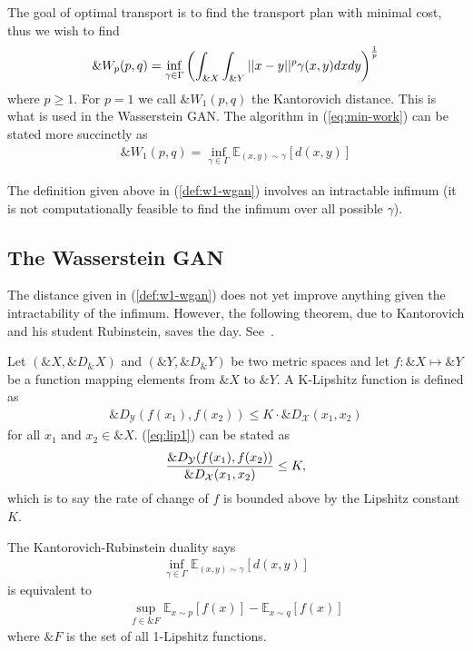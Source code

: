 The goal of optimal transport is to find the transport plan with minimal cost,
thus we wish to find
\begin{align}%
  \label{eq:min-work}
  \&W_p(p, q) = \inf_{\gamma \in \Gamma} \left( \int_{\&X}\int_{\&Y}||x-y||^p\gamma(x, y)dxdy \right)^{1 \over p}
\end{align}
where $p \geq 1$. For $p = 1$ we call $\&W_1(p, q)$ the Kantorovich distance.
This is what is used in the Wasserstein GAN. The algorithm in
(\ref{eq:min-work}) can be stated more succinctly as
\begin{align}
  \label{def:w1-wgan}
  \&W_1(p, q) = \inf_{\gamma \in \Gamma}\mathbb{E}_{(x,y) \sim \gamma}
  \left[ d(x, y) \right]
\end{align}
\begin{remark}
  The definition given above in (\ref{def:w1-wgan}) involves an intractable
  infimum (it is not computationally feasible to find the infimum over all
  possible $\gamma$).
\end{remark}

\subsection{The Wasserstein GAN}

The distance given in (\ref{def:w1-wgan}) does not yet improve anything given
the intractability of the infimum. However, the following theorem, due to
Kantorovich and his student Rubinstein, saves the day.
See~\cite{ref:kantorovich-rubinstein-1958}.

\begin{definition}
  Let $(\&X, \&D_\&X)$ and $(\&Y, \&D_\&Y)$ be two metric spaces and let $f: \&X
  \mapsto \&Y$ be a function mapping elements from $\&X$ to $\&Y$. A
  \textnormal{\sffamily K-Lipshitz} function is defined as
  \begin{align}
    \label{eq:lip1}
    \&D_{\mathcal{Y}}(f(x_1), f(x_2)) \leq K \cdot {\&D}_{\mathcal{X}}(x_1, x_2)
  \end{align}
  for all $x_1$ and $x_2 \in \&X$. (\ref{eq:lip1}) can be stated as
  \begin{align}
    {\&D_{\mathcal{Y}}(f(x_1), f(x_2)) \over \&D_{\mathcal{X}}(x_1, x_2)} \leq K,
  \end{align}
  which is to say the rate of change of $f$ is bounded above by the Lipshitz
  constant $K$.
\end{definition}

\begin{theorem}
  The \textnormal{\sffamily Kantorovich-Rubinstein duality} says
  \begin{align}
    \inf_{\gamma \in \Gamma}\mathbb{E}_{(x,y) \sim \gamma} \left[d(x, y)\right]
  \end{align}
  is equivalent to
  \begin{align}
    \sup_{f \in \&{F}} \mathbb{E}_{x \sim p}\left[ f(x) \right] - \mathbb{E}_{x \sim q}\left[ f(x) \right]
  \end{align}
  where $\&{F}$ is the set of all 1-Lipshitz functions.
\end{theorem}

